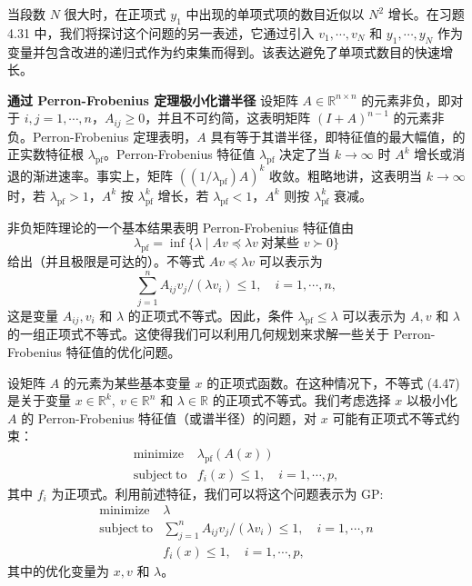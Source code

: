 \documentclass[UTF8, 12pt, fontset=fandol, oneside]{ctexart}
\begin{document}
当段数 $N$ 很大时，在正项式 $y_1$ 中出现的单项式项的数目近似以 $N^2$ 增长。在习题 4.31 中，我们将探讨这个问题的另一表述，它通过引入 $v_1,\cdots,v_N$ 和 $y_1,\cdots,y_N$ 作为变量并包含改进的递归式作为约束集而得到。该表达避免了单项式数目的快速增长。

\noindent\textbf{通过 Perron-Frobenius 定理极小化谱半径}\quad
设矩阵 $A\in\mathbb{R}^{n\times n}$ 的元素非负，即对于 $i,j=1,\cdots,n$，$A_{ij}\geq 0$，并且不可约简，这表明矩阵 $(I+A)^{n-1}$ 的元素非负。Perron-Frobenius 定理表明，$A$ 具有等于其谱半径，即特征值的最大幅值，的正实数特征根 $\lambda_{\mathrm{pf}}$。Perron-Frobenius 特征值 $\lambda_{\mathrm{pf}}$ 决定了当 $k\to\infty$ 时 $A^k$ 增长或消退的渐进速率。事实上，矩阵 $((1/\lambda_{\mathrm{pf}})A)^k$ 收敛。粗略地讲，这表明当 $k\to\infty$ 时，若 $\lambda_{\mathrm{pf}}>1$，$A^k$ 按 $\lambda_{\mathrm{pf}}^k$ 增长，若 $\lambda_{\mathrm{pf}}<1$，$A^k$ 则按 $\lambda_{\mathrm{pf}}^k$ 衰减。

非负矩阵理论的一个基本结果表明 Perron-Frobenius 特征值由
\[
\lambda_{\mathrm{pf}}=\inf\{\lambda\mid Av\preceq \lambda v\ \text{对某些 }v\succ 0\}
\]
给出（并且极限是可达的）。不等式 $Av\preceq \lambda v$ 可以表示为
\begin{equation}
\sum_{j=1}^n A_{ij}v_j/(\lambda v_i)\leq 1,\quad i=1,\cdots,n,
\tag{4.47}
\end{equation}
这是变量 $A_{ij},v_i$ 和 $\lambda$ 的正项式不等式。因此，条件 $\lambda_{\mathrm{pf}}\leq \lambda$ 可以表示为 $A,v$ 和 $\lambda$ 的一组正项式不等式。这使得我们可以利用几何规划来求解一些关于 Perron-Frobenius 特征值的优化问题。

设矩阵 $A$ 的元素为某些基本变量 $x$ 的正项式函数。在这种情况下，不等式 (4.47) 是关于变量 $x\in\mathbb{R}^k,\ v\in\mathbb{R}^n$ 和 $\lambda\in\mathbb{R}$ 的正项式不等式。我们考虑选择 $x$ 以极小化 $A$ 的 Perron-Frobenius 特征值（或谱半径）的问题，对 $x$ 可能有正项式不等式约束：
\[
\begin{array}{ll}
\mathop{\mathrm{minimize}} & \lambda_{\mathrm{pf}}(A(x))\\
\mathrm{subject\ to} & f_i(x)\leq 1,\quad i=1,\cdots,p,
\end{array}
\]
其中 $f_i$ 为正项式。利用前述特征，我们可以将这个问题表示为 GP:
\[
\begin{array}{ll}
\mathop{\mathrm{minimize}} & \lambda\\
\mathrm{subject\ to} & \displaystyle\sum_{j=1}^n A_{ij}v_j/(\lambda v_i)\leq 1,\quad i=1,\cdots,n\\
& f_i(x)\leq 1,\quad i=1,\cdots,p,
\end{array}
\]
其中的优化变量为 $x,v$ 和 $\lambda$。
\end{document}
